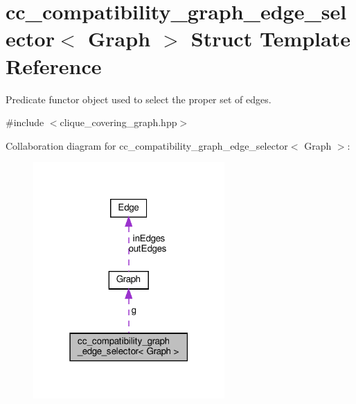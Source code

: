 \hypertarget{structcc__compatibility__graph__edge__selector}{}\section{cc\+\_\+compatibility\+\_\+graph\+\_\+edge\+\_\+selector$<$ Graph $>$ Struct Template Reference}
\label{structcc__compatibility__graph__edge__selector}


Predicate functor object used to select the proper set of edges.  




{\ttfamily \#include $<$clique\+\_\+covering\+\_\+graph.\+hpp$>$}



Collaboration diagram for cc\+\_\+compatibility\+\_\+graph\+\_\+edge\+\_\+selector$<$ Graph $>$\+:
\nopagebreak
\begin{figure}[H]
\begin{center}
\leavevmode
\includegraphics[width=207pt]{db/d73/structcc__compatibility__graph__edge__selector__coll__graph}
\end{center}
\end{figure}
